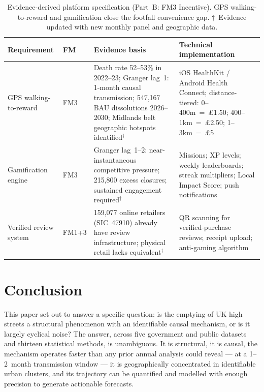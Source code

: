 \documentclass[12pt,a4paper]{article}
\begin{document}
\begin{table}[H]
\centering
\caption{Evidence-derived platform specification (Part~B: FM3 Incentive).
GPS walking-to-reward and gamification close the footfall convenience gap.
$\dagger$~Evidence updated with new monthly panel and geographic data.}
\label{tab:spec_b}
\small{}
\begin{tabular}{@{}L{3.0cm}C{1.4cm}L{5.8cm}L{5.8cm}@{}}
\toprule
{}\color{white}\textbf{Requirement} &
\color{white}\textbf{FM} &
\color{white}\textbf{Evidence basis} &
\color{white}\textbf{Technical implementation} \\
\midrule
GPS walking-to-reward & FM3 &
Death rate 52--53\% in 2022--23; Granger lag~1: 1-month
causal transmission; 547,167 BAU dissolutions 2026--2030;
Midlands belt geographic hotspots identified$^\dagger$ &
iOS HealthKit / Android Health Connect;
distance-tiered: 0--400m~=~\pounds1.50; 400--1km~=~\pounds2.50; 1--3km~=~\pounds5 \\
Gamification engine & FM3 &
Granger lag~1--2: near-instantaneous competitive pressure;
215,800 excess closures; sustained engagement required$^\dagger$ &
Missions; XP levels; weekly leaderboards;
streak multipliers; Local Impact Score; push notifications \\
Verified review system & FM1+3 &
159,077 online retailers (SIC~47910) already have review
infrastructure; physical retail lacks equivalent$^\dagger$ &
QR scanning for verified-purchase reviews;
receipt upload; anti-gaming algorithm \\
\bottomrule
\end{tabular}
\end{table}


\section{Conclusion}
\label{sec:conclusion}

This paper set out to answer a specific question: is the emptying of UK high streets a
structural phenomenon with an identifiable causal mechanism, or is it largely cyclical
noise? The answer, across five government and public datasets and thirteen statistical
methods, is unambiguous. It is structural, it is causal, the mechanism operates faster
than any prior annual analysis could reveal --- at a 1--2~month transmission window ---
it is geographically concentrated in identifiable urban clusters, and its trajectory
can be quantified and modelled with enough precision to generate actionable forecasts.
\end{document}
